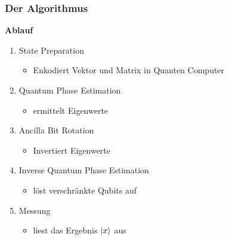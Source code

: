     \begin{frame}
    \frametitle{Der Algorithmus}

        \textbf{Ablauf}
        \begin{enumerate}
            \item State Preparation
            \begin{itemize}
                \item Enkodiert Vektor und Matrix in Quanten Computer
            \end{itemize}
            \item Quantum Phase Estimation
            \begin{itemize}
                \item ermittelt Eigenwerte 
            \end{itemize}
            \item Ancilla Bit Rotation 
            \begin{itemize}
                \item  Invertiert Eigenwerte
            \end{itemize}
            \item Inverse Quantum Phase Estimation
             \begin{itemize}
                \item löst verschränkte Qubits auf
            \end{itemize}
            
            \item Messung
             \begin{itemize}
                \item liest das Ergebnis $\ket{x}$ aus
            \end{itemize}
 
        \end{enumerate}

    \end{frame}

